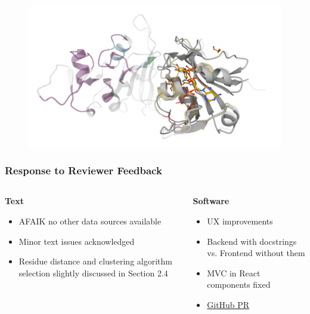 \documentclass[aspectratio=169]{beamer}
\begin{document}
\begin{frame}
  \begin{figure}
    \centering
    \includegraphics[width=\linewidth,height=\textheight,keepaspectratio]{fig/screen4.png}
  \end{figure}

\end{frame}

\begin{frame}[plain]
\end{frame}

\begin{frame}
  \frametitle{Response to Reviewer Feedback}
  \begin{columns}
    \begin{column}{0.5\textwidth}
      \textbf{Text}
      \begin{itemize}
        \item AFAIK no other data sources available
        \item Minor text issues acknowledged
        \item Residue distance and clustering algorithm selection slightly discussed in Section 2.4
      \end{itemize}
    \end{column}
    \begin{column}{0.5\textwidth}
      \textbf{Software}
      \begin{itemize}
        \item UX improvements
        \item Backend with docstrings vs. Frontend without them
        \item MVC in React components fixed
        \item \textcolor{ITMOblue}{\href{https://github.com/luk27official/cryptoshow/pull/1}{GitHub PR}}
      \end{itemize}
    \end{column}
  \end{columns}
\end{frame}

\begin{frame}[plain]
\end{frame}
\end{document}
